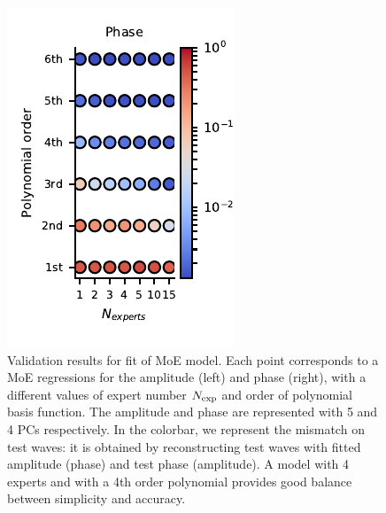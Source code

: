 \documentclass[twocolumn,showpacs,preprintnumbers,nofootinbib,prd,
superscriptaddress,10pt]{revtex4-1}
\begin{document}
\begin{figure}[!t]
\begin{minipage}{.5\linewidth}
    \end{minipage}\hfill
    \begin{minipage}{.5\linewidth}
        \centering
        \includegraphics[width=\linewidth]{img/MoE_mismatch_ph.pdf}
    \end{minipage}
	\caption{Validation results for fit of MoE model. Each point corresponds to a MoE regressions for the amplitude (left) and phase (right), with a different values of expert number $N_{\rm exp}$ and order of polynomial basis function.
The amplitude and phase are represented with 5 and 4 PCs respectively.
In the colorbar, we represent the mismatch on test waves: it is obtained by reconstructing test waves with fitted amplitude (phase) and test phase (amplitude).
A model with 4 experts and with a 4th order polynomial provides good balance between simplicity and accuracy.
}
	\label{fig:MoE_test}
\end{figure}
\end{document}
